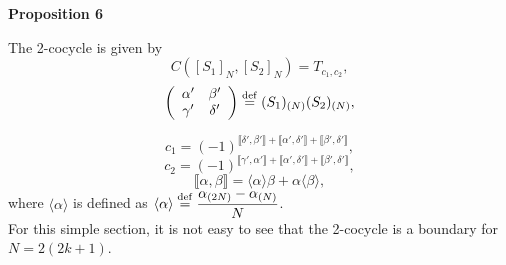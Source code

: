\documentclass[12pt]{iopart}
\newcommand{\deq}{\stackrel{\rm{\tiny def}}{=}}
\begin{document}
\noindent
{\bf Proposition 6}
\vspace{2mm}

The 2-cocycle is given by
\begin{equation}
C([S_1]_N,[S_2]_N)=T_{c_1,c_2},
\end{equation}
\begin{equation}
\left(\begin{array}{cc}
\alpha' & \beta' \\
\gamma' & \delta' \\
\end{array}\right)
\deq
(S_1)_{(N)}(S_2)_{(N)},
\end{equation}

\begin{equation}
c_1
=
(-1)^{
\llbracket\delta',\beta'\rrbracket
+
\llbracket\alpha',\delta'\rrbracket
+
\llbracket\beta',\delta'\rrbracket
},
\end{equation}
\begin{equation}
c_2
=
(-1)^{
\llbracket\gamma',\alpha'\rrbracket
+
\llbracket\alpha',\delta'\rrbracket
+
\llbracket\beta',\delta'\rrbracket
},
\end{equation}
\begin{equation}
\llbracket \alpha,\beta\rrbracket=\langle\alpha\rangle\beta+\alpha\langle\beta\rangle,
\end{equation}
where
\(\langle\alpha\rangle\) is %
defined as
\(\langle\alpha\rangle\deq\displaystyle\frac{\alpha_{(2N)}-\alpha_{(N)}}N\).
\\

For this simple section, it is not easy to see that the 2-cocycle is a boundary for \(N=2(2k+1)\).
\end{document}
